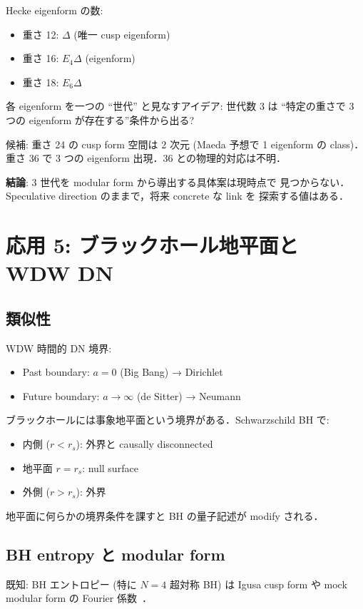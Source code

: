 \documentclass[11pt,a4paper]{article}
\begin{document}
Hecke eigenform の数:
\begin{itemize}
\item 重さ 12: $\Delta$ (唯一 cusp eigenform)
\item 重さ 16: $E_4 \Delta$ (eigenform)
\item 重さ 18: $E_6 \Delta$
\end{itemize}

各 eigenform を一つの ``世代'' と見なすアイデア: 世代数 3 は
``特定の重さで 3 つの eigenform が存在する''条件から出る?

候補: 重さ 24 の cusp form 空間は 2 次元 (Maeda 予想で 1 eigenform の
class)．重さ 36 で 3 つの eigenform 出現．36 との物理的対応は不明．

\textbf{結論}: 3 世代を modular form から導出する具体案は現時点で
見つからない．Speculative direction のままで，将来 concrete な link を
探索する値はある．

\section{応用 5: ブラックホール地平面と WDW DN}

\subsection{類似性}

WDW 時間的 DN 境界:
\begin{itemize}
\item Past boundary: $a = 0$ (Big Bang) → Dirichlet
\item Future boundary: $a \to \infty$ (de Sitter) → Neumann
\end{itemize}

ブラックホールには事象地平面という境界がある．Schwarzschild BH で:
\begin{itemize}
\item 内側 ($r < r_s$): 外界と causally disconnected
\item 地平面 $r = r_s$: null surface
\item 外側 ($r > r_s$): 外界
\end{itemize}

地平面に何らかの境界条件を課すと BH の量子記述が modify される．

\subsection{BH entropy と modular form}

既知: BH エントロピー (特に $N=4$ 超対称 BH) は Igusa cusp form や
mock modular form の Fourier 係数~\cite{DMVV1997, Dabholkar2012}．
\end{document}
